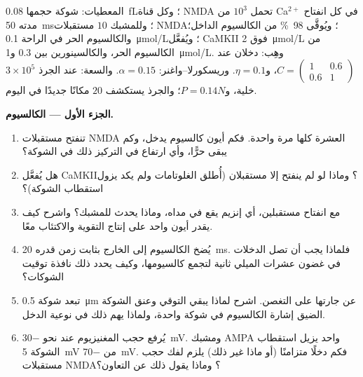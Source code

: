 \begin{problem}
\label{pb:b3:learning-memory:1}
المعطيات: شوكة حجمها \qty{0.08}{fL}؛ وكل قناة NMDA تحمل
$10^{3}$ من Ca$^{2+}$ في كل انفتاح مدته \qty{50}{ms}؛ وللمشبك
$10$ مستقبلات NMDA؛ ويُوقَّى \qty{98}{\%} من الكالسيوم
الداخل؛ والكالسيوم الحر في الراحة \qty{0.1}{\micro mol/L}؛
ويُفعَّل CaMKII فوق \qty{2}{\micro mol/L} من الكالسيوم الحر،
والكالسينورين بين $0.3$ و\qty{1}{\micro mol/L}. وهِب: دخلان
عند $C = \begin{pmatrix}1 &
0.6\\ 0.6 & 1\end{pmatrix}$، و$\eta = 0.1$. وريسكورلا--واغنر: $\alpha =
0.15$. والسعة:  عند الجرذ $3\times 10^{5}$ خلية، و$P = 0.14N$؛
والجرذ يستكشف $20$ مكانًا جديدًا في اليوم.

\medskip
\noindent\textbf{الجزء الأول --- الكالسيوم.}
\begin{enumerate}
  \item تنفتح مستقبلات NMDA العشرة كلها مرة واحدة. فكم أيون
        كالسيوم يدخل، وكم يبقى حرًّا، وأي ارتفاع في التركيز
        ذلك في الشوكة؟
  \item هل يُفعَّل CaMKII؟ وماذا لو لم ينفتح إلا مستقبلان
        (أُطلق الغلوتامات ولم يكد يزول استقطاب الشوكة)؟
  \item مع انفتاح مستقبلين، أي إنزيم يقع في مداه، وماذا يحدث
        للمشبك؟ واشرح كيف يقدر أيون واحد على إنتاج التقوية
        والاكتئاب معًا.
  \item يُضخ الكالسيوم إلى الخارج بثابت زمن قدره \qty{20}{ms}.
        فلماذا يجب أن تصل الدخلات في غضون عشرات الميلي ثانية
        لتجمع كالسيومها، وكيف يحدد ذلك نافذة توقيت الشوكات؟
  \item تبعد شوكة \qty{0.5}{\micro m} عن جارتها على التغصن.
        اشرح لماذا يبقي التوقي وعنق الشوكة الضيق إشارة
        الكالسيوم في شوكة واحدة، ولماذا يهم ذلك في نوعية
        الدخل.
  \item يُرفع حجب المغنيزيوم عند نحو \qty{-30}{mV}. ومشبك AMPA
        واحد يزيل استقطاب الشوكة \qty{5}{mV} من \qty{-70}{mV}.
        فكم دخلًا متزامنًا (أو ماذا غير ذلك) يلزم لفك حجب
        مستقبلات NMDA؟ وماذا يقول ذلك عن التعاون؟
\end{enumerate}


\end{problem}
